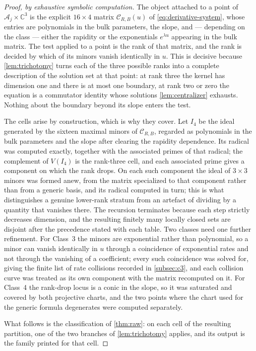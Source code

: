 \documentclass[11pt,reqno]{amsart}
\theoremstyle{plain}
\theoremstyle{definition}
\theoremstyle{remark}
\numberwithin{equation}{section}
\newcommand{\C}{\mathbb C}
\begin{document}
\begin{proof}[Proof, by exhaustive symbolic computation]
The object attached to a point of $\mathcal A_j\times\C^3$ is the explicit
$16\times4$ matrix $\mathcal C_{R,B}(u)$ of \cref{eq:derivative-system}, whose
entries are polynomials in the bulk parameters, the slope, and --- depending on
the class --- either the rapidity or the exponentials $e^{\lambda u}$ appearing
in the bulk matrix. The test applied to a point is the rank of that matrix, and
the rank is decided by which of its minors vanish identically in $u$. This is
decisive because \cref{lem:trichotomy} turns each of the three possible ranks
into a complete description of the solution set at that point: at rank three the
kernel has dimension one and there is at most one boundary, at rank two or zero
the equation is a commutator identity whose solutions \cref{lem:centralizer}
exhausts. Nothing about the boundary beyond its slope enters the test.

The cells arise by construction, which is why they cover. Let $I_4$ be the ideal
generated by the sixteen maximal minors of $\mathcal C_{R,B}$, regarded as
polynomials in the bulk parameters and the slope after clearing the rapidity
dependence. Its radical was computed exactly, together with the associated primes
of that radical; the complement of $V(I_4)$ is the rank-three cell, and each
associated prime gives a component on which the rank drops. On each such
component the ideal of $3\times3$ minors was formed anew, from the matrix
specialized to that component rather than from a generic basis, and its radical
computed in turn; this is what distinguishes a genuine lower-rank stratum from an
artefact of dividing by a quantity that vanishes there. The recursion terminates
because each step strictly decreases dimension, and the resulting finitely many
locally closed sets are disjoint after the precedence stated with each table.
Two classes need one further refinement. For Class~3 the minors are exponential
rather than polynomial, so a minor can vanish identically in $u$ through a
coincidence of exponential rates and not through the vanishing of a coefficient;
every such coincidence was solved for, giving the finite list of rate collisions
recorded in \cref{subsec:c3}, and each collision curve was treated as its own
component with the matrix recomputed on it. For Class~4 the rank-drop locus is a
conic in the slope, so it was saturated and covered by both projective charts,
and the two points where the chart used for the generic formula degenerates were
computed separately.

What follows is the classification of \cref{thm:raw}: on each cell of the
resulting partition, one of the two branches of \cref{lem:trichotomy} applies,
and its output is the family printed for that cell.
\end{proof}
\end{document}
